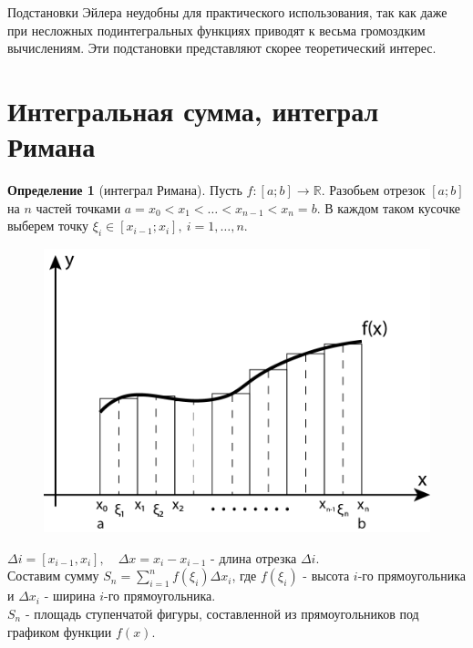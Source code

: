 \documentclass{report}
\theoremstyle{definition}
\newtheorem*{definition}{Определение}
\begin{document}
Подстановки Эйлера неудобны для практического использования, так как даже при несложных подинтегральных функциях приводят к весьма громоздким вычислениям. Эти подстановки представляют скорее теоретический интерес.

\section{Интегральная сумма, интеграл Римана}

\begin{definition}[интеграл Римана]
    Пусть $f:[a;b]\rightarrow\mathbb{R}$. Разобьем отрезок $[a;b]$ на $n$ частей точками $a = x_{0} < x_{1} < \ldots <
        x_{n-1} < x_{n} = b$. В каждом таком кусочке выберем точку $\xi_{i} \in [x_{i-1};x_{i}], \ i = 1,\ldots ,n$.\\

    \begin{figure}[H]
        \begin{center}
            \includegraphics[scale=0.7]{graph1.png}\label{figure1}
        \end{center}
    \end{figure}

    $\Delta i = [x_{i-1}, x_{i}], \quad \Delta x = x_{i} - x_{i-1}$ - длина отрезка $\Delta i$.\\

    Составим сумму $S_{n} = \sum_{i=1}^{n} f(\xi_{i})\Delta x_{i}$, где $f(\xi_{i})$ - высота $i$-го прямоугольника и
    $\Delta x_{i}$ - ширина $i$-го прямоугольника.\\

    $S_{n}$ - площадь ступенчатой фигуры, составленной из прямоугольников под графиком функции $f(x)$.\\


\end{definition}
\end{document}
